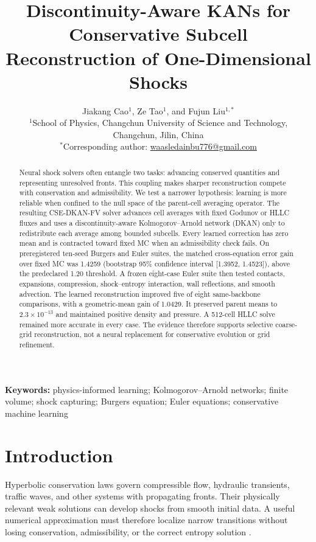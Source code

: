\documentclass[10pt,twocolumn]{article}
\title{Discontinuity-Aware KANs for Conservative Subcell Reconstruction of One-Dimensional Shocks}
\author{Jiakang Cao$^{1}$, Ze Tao$^{1}$, and Fujun Liu$^{1,*}$\\
\small $^{1}$School of Physics, Changchun University of Science and Technology,\\
\small Changchun, Jilin, China\\
\small $^{*}$Corresponding author: \href{mailto:waasledainbu776@gmail.com}{waasledainbu776@gmail.com}}
\date{}
\newcommand{\method}{CSE-DKAN-FV}
\begin{document}
\maketitle

\begin{abstract}
Neural shock solvers often entangle two tasks: advancing conserved quantities and representing unresolved fronts. This coupling makes sharper reconstruction compete with conservation and admissibility. We test a narrower hypothesis: learning is more reliable when confined to the null space of the parent-cell averaging operator. The resulting \method{} solver advances cell averages with fixed Godunov or HLLC fluxes and uses a discontinuity-aware Kolmogorov--Arnold network (DKAN) only to redistribute each average among bounded subcells. Every learned correction has zero mean and is contracted toward fixed MC when an admissibility check fails. On preregistered ten-seed Burgers and Euler suites, the matched cross-equation error gain over fixed MC was 1.4259 (bootstrap 95\% confidence interval [1.3952, 1.4523]), above the predeclared 1.20 threshold. A frozen eight-case Euler suite then tested contacts, expansions, compression, shock--entropy interaction, wall reflections, and smooth advection. The learned reconstruction improved five of eight same-backbone comparisons, with a geometric-mean gain of 1.0429. It preserved parent means to $2.3\times10^{-13}$ and maintained positive density and pressure. A 512-cell HLLC solve remained more accurate in every case. The evidence therefore supports selective coarse-grid reconstruction, not a neural replacement for conservative evolution or grid refinement.
\end{abstract}

\noindent\textbf{Keywords:} physics-informed learning; Kolmogorov--Arnold networks; finite volume; shock capturing; Burgers equation; Euler equations; conservative machine learning

\section{Introduction}

Hyperbolic conservation laws govern compressible flow, hydraulic transients, traffic waves, and other systems with propagating fronts. Their physically relevant weak solutions can develop shocks from smooth initial data. A useful numerical approximation must therefore localize narrow transitions without losing conservation, admissibility, or the correct entropy solution \citep{leveque2002finitevolume,toro2009riemann}.
\end{document}
